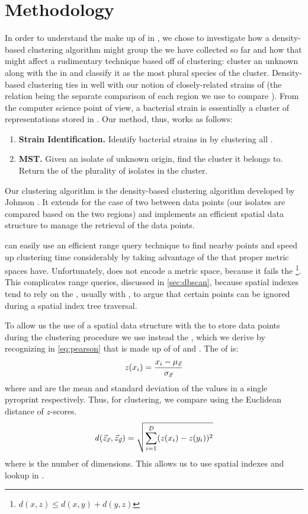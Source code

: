 \section{Methodology}\label{sec:methodology:clustering}
In order to understand the make up of \bslongs{} in \cplop{}, we chose to investigate how a density-based clustering algorithm might group the \isols{} we have collected so far and how that might affect a rudimentary \mst{} technique based off of clustering: cluster an unknown \isol{} along with the \isols{} in \cplop{} and classify it as the most plural species of the cluster.
Density-based clustering ties in well with our notion of closely-related strains of \ecoli{} (the relation being the separate \pearson{} comparison of each \itsshort{} region we use to compare \isols{}).
From the computer science point of view, a bacterial strain is essentially a cluster of \ecoli{} \isol{} representations stored in \cplop{}.
Our \mst{} method, thus, works as follows:
\begin{enumerate}
    \item \textbf{Strain Identification.} Identify bacterial strains in \cplop{} by clustering
    all \cplop{} \isols{}.
    \item \textbf{MST.} Given an isolate of unknown origin, find the cluster it belongs to.
    Return the \spec{} of the plurality of isolates in the cluster.
\end{enumerate}

Our clustering algorithm is the density-based clustering algorithm developed by Johnson \cite{johnson2015density}.
It extends \dbscan{} for the case of two \compfuncs{} between data points (our isolates are compared based on the two \itsshort{} regions) and implements an efficient spatial data structure to manage the retrieval of the data points.

\dbscan{} can easily use an efficient range query technique to find nearby points and speed up clustering time considerably by taking advantage of the \trieq{} that proper metric spaces have.
Unfortunately, \pearson{} does not encode a metric space, because it fails the \trieq{}\footnote{$d(x,z)\leq d(x,y) + d(y,z)$}. 
This complicates range queries, discussed in \autoref{sec:dbscan}, because spatial indexes tend to rely on the \trieq{}, usually with \euclid{}, to argue that certain points can be ignored during a spatial index tree traversal. 

To allow us the use of a spatial data structure with the \pearson{} to store data points during the clustering procedure we use instead the \clustplop{}, which we derive by recognizing in \autoref{eq:pearson} that \pearson{} is made up of \zscores{} of \pcveca{} and \pcvecb{}. 
The \zscore{} of \pcveca{} is:
\[
 \mathit{z}{}(x_i) = \frac{x_i - \mu_{\vec{x}}}{\sigma_{\vec{x}}}
\]
where \vecavg{\pca} and \vecstddev{\pca} are the mean and standard deviation of the values in a single pyroprint respectively. 
Thus, for clustering, we compare \pyros{} using the Euclidean distance \euczfunclabel{} of $z$-scores.
\begin{equation}\label{eq:euclidean_zscores}
 \mathit{d}{}(\vec{z}_{\vec{x}}, \vec{z}_{\vec{y}}) = \sqrt{ \sum_{i = 1}^{D}(\mathit{z}{}(x_i) - \mathit{z}{}(y_i))^2 } 
\end{equation}
where \numdims{} is the number of dimensions.
This allows us to use spatial indexes and  lookup in \dbscan{}.

